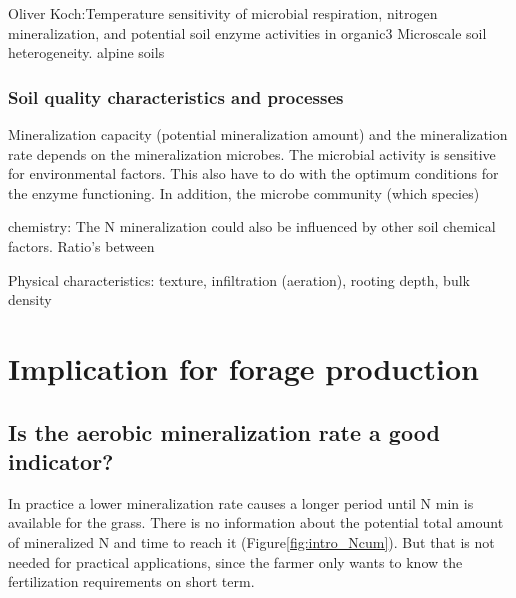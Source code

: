 \documentclass[10pt,twoside,dutch,english]{report}
\begin{document}
Oliver Koch:Temperature sensitivity of microbial respiration, nitrogen
mineralization, and potential soil enzyme activities in organic3
Microscale soil heterogeneity. 
alpine soils
\subsubsection{Soil quality characteristics and processes}
Mineralization capacity (potential mineralization amount) and  the mineralization rate depends on the mineralization microbes. The microbial activity is sensitive for environmental factors. This also have to do with the optimum conditions for the enzyme functioning. In addition, the microbe community (which species) 
                            

	chemistry: 
The N mineralization could also be influenced by other soil chemical factors. Ratio's between

	Physical characteristics: texture, infiltration (aeration),  rooting depth, bulk density
    


\section{Implication for forage production}
\subsection{Is the aerobic mineralization rate a good indicator?}
In practice a lower mineralization rate causes a longer period until N min is available for the grass.  There is no information about the potential total amount of mineralized N and time to reach it (Figure\ref{fig:intro_Ncum}). But that is not needed for practical applications, since the farmer only wants to know the fertilization requirements on short term. 
\end{document}
